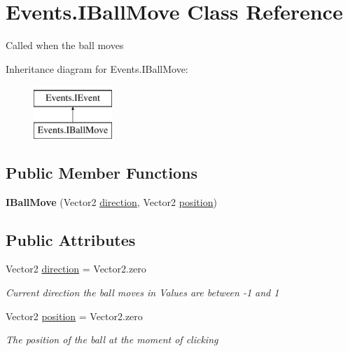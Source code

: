 \hypertarget{class_events_1_1_i_ball_move}{}\section{Events.\+I\+Ball\+Move Class Reference}
\label{class_events_1_1_i_ball_move}


Called when the ball moves  


Inheritance diagram for Events.\+I\+Ball\+Move\+:\begin{figure}[H]
\begin{center}
\leavevmode
\includegraphics[height=2.000000cm]{class_events_1_1_i_ball_move}
\end{center}
\end{figure}
\subsection*{Public Member Functions}
\begin{DoxyCompactItemize}
\item 
{\bfseries I\+Ball\+Move} (Vector2 \hyperlink{class_events_1_1_i_ball_move_aaa7ee0633897f9e4e56467a46d56e3cc}{direction}, Vector2 \hyperlink{class_events_1_1_i_ball_move_a15ca83aec7e67497dd36c046fca0bbd7}{position})\hypertarget{class_events_1_1_i_ball_move_aff7115d9719a72e1fbb7718a10a93860}{}\label{class_events_1_1_i_ball_move_aff7115d9719a72e1fbb7718a10a93860}

\end{DoxyCompactItemize}
\subsection*{Public Attributes}
\begin{DoxyCompactItemize}
\item 
Vector2 \hyperlink{class_events_1_1_i_ball_move_aaa7ee0633897f9e4e56467a46d56e3cc}{direction} = Vector2.\+zero
\begin{DoxyCompactList}\small\item\em Current direction the ball moves in Values are between -\/1 and 1 \end{DoxyCompactList}\item 
Vector2 \hyperlink{class_events_1_1_i_ball_move_a15ca83aec7e67497dd36c046fca0bbd7}{position} = Vector2.\+zero
\begin{DoxyCompactList}\small\item\em The position of the ball at the moment of clicking \end{DoxyCompactList}\end{DoxyCompactItemize}


